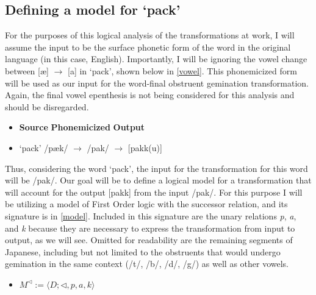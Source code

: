 \documentclass{article}
\begin{document}
\subsection{Defining a model for ‘pack'}
For the purposes of this logical analysis of the transformations at work, I will assume the input to be the surface phonetic form of the word in the original language (in this case, English). Importantly, I will be ignoring the vowel change between [æ] $\rightarrow$ [a] in ‘pack', shown below in \ref{vowel}. This phonemicized form will be used as our input for the word-final obstruent gemination transformation. Again, the final vowel epenthesis is not being considered for this analysis and should be disregarded.
\pagebreak

\begin{exe}
    \ex
    \label{vowel}
    \begin{itemize}
        \item [] \hspace{33} \textbf{Source} \hspace{25} \textbf{Phonemicized} \hspace{29} \textbf{Output}
        \item [] ‘pack' \hspace{4} /pæk/ \hspace{15}  $\rightarrow$ \hspace{15}   /pak/ \hspace{20} $\rightarrow$ \hspace{20} [pakk(u)]
    \end{itemize}
\end{exe}

Thus, considering the word ‘pack', the input for the transformation for this word will be /pak/. Our goal will be to define a logical model for a transformation that will account for the output [pakk] from the input /pak/. For this purpose I will be utilizing a model of First Order logic with the successor relation, and its signature is in \ref{model}. Included in this signature are the unary relations \textit{p}, \textit{a}, and \textit{k} because they are necessary to express the transformation from input to output, as we will see. Omitted for readability are the remaining segments of Japanese, including but not limited to the obstruents that would undergo gemination in the same context (/t/, /b/, /d/, /g/) as well as other vowels.

\begin{exe}
    \ex
    \label{model}
    \begin{itemize}
        \item [] $M^\triangleleft := \langle D; \triangleleft, p, a, k \rangle $
    \end{itemize}
\end{exe}
\end{document}
